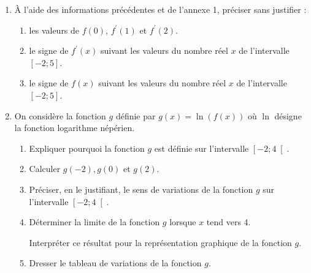 \begin{enumerate}
     \item
     À l'aide des informations précédentes et de l'annexe 1, préciser sans justifier :
\begin{enumerate}[label=\alph*.]
          \item
          les valeurs de $f\left(0\right)$, $f^{\prime}\left(1\right)$ et $f^{\prime}\left(2\right)$.
          \item
          le signe de $f^{\prime}\left(x\right)$ suivant les valeurs du nombre réel $x$ de l'intervalle $\left[- 2; 5\right]$.
          \item
          le signe de $f\left(x\right)$ suivant les valeurs du nombre réel $x$ de l'intervalle $\left[- 2; 5\right]$.
     \end{enumerate}
     \item
     On considère la fonction $g$ définie par $g\left(x\right)=\ln \left(f\left(x\right)\right)$  où $\ln$ désigne la fonction logarithme népérien.
     \begin{enumerate}[label=\alph*.]
          \item
          Expliquer pourquoi la fonction $g$ est définie sur l'intervalle $\left[- 2; 4\right[$.
          \item
          Calculer $g\left(-2\right), g\left(0\right)$ et $g\left(2\right)$.
          \item
          Préciser, en le justifiant, le sens  de variations de la fonction $g$ sur l'intervalle $\left[- 2; 4\right[$.
          \item
          Déterminer la limite de la fonction $g$ lorsque $x$ tend vers 4.
          \par
          Interpréter ce résultat pour la représentation graphique de la fonction $g$.
          \item
          Dresser le tableau de variations de la fonction $g$.
     \end{enumerate}
\end{enumerate}
